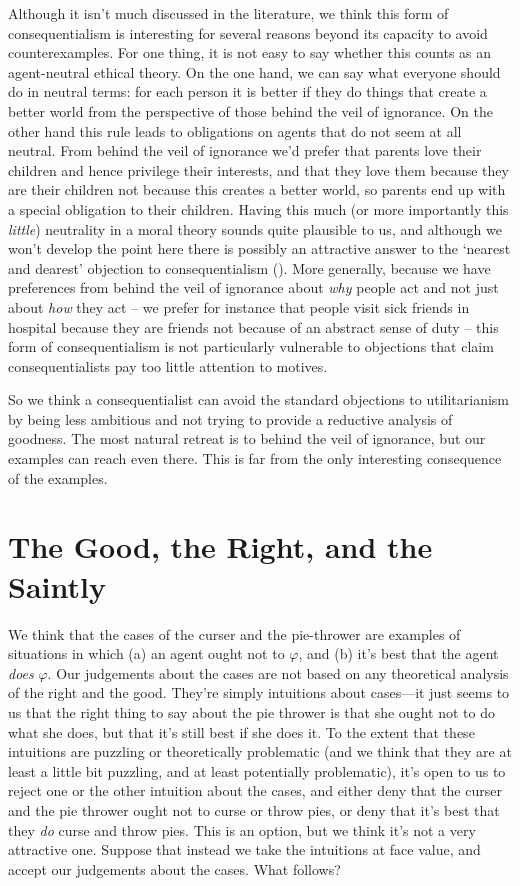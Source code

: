 \documentclass[
  11pt,
  letterpaper,
  DIV=11,
  numbers=noendperiod,
  twoside]{scrartcl}
\begin{document}
Although it isn't much discussed in the literature, we think this form
of consequentialism is interesting for several reasons beyond its
capacity to avoid counterexamples. For one thing, it is not easy to say
whether this counts as an agent-neutral ethical theory. On the one hand,
we can say what everyone should do in neutral terms: for each person it
is better if they do things that create a better world from the
perspective of those behind the veil of ignorance. On the other hand
this rule leads to obligations on agents that do not seem at all
neutral. From behind the veil of ignorance we'd prefer that parents love
their children and hence privilege their interests, and that they love
them because they are their children not because this creates a better
world, so parents end up with a special obligation to their children.
Having this much (or more importantly this \emph{little}) neutrality in
a moral theory sounds quite plausible to us, and although we won't
develop the point here there is possibly an attractive answer to the
`nearest and dearest' objection to consequentialism
(). More generally, because we
have preferences from behind the veil of ignorance about \emph{why}
people act and not just about \emph{how} they act -- we prefer for
instance that people visit sick friends in hospital because they are
friends not because of an abstract sense of duty -- this form of
consequentialism is not particularly vulnerable to objections that claim
consequentialists pay too little attention to motives.

So we think a consequentialist can avoid the standard objections to
utilitarianism by being less ambitious and not trying to provide a
reductive analysis of goodness. The most natural retreat is to behind
the veil of ignorance, but our examples can reach even there. This is
far from the only interesting consequence of the examples.

\section{The Good, the Right, and the
Saintly}\label{the-good-the-right-and-the-saintly}

We think that the cases of the curser and the pie-thrower are examples
of situations in which (a) an agent ought not to \(\varphi\), and (b)
it's best that the agent \emph{does} \(\varphi\). Our judgements about
the cases are not based on any theoretical analysis of the right and the
good. They're simply intuitions about cases---it just seems to us that
the right thing to say about the pie thrower is that she ought not to do
what she does, but that it's still best if she does it. To the extent
that these intuitions are puzzling or theoretically problematic (and we
think that they are at least a little bit puzzling, and at least
potentially problematic), it's open to us to reject one or the other
intuition about the cases, and either deny that the curser and the pie
thrower ought not to curse or throw pies, or deny that it's best that
they \emph{do} curse and throw pies. This is an option, but we think
it's not a very attractive one. Suppose that instead we take the
intuitions at face value, and accept our judgements about the cases.
What follows?
\end{document}
